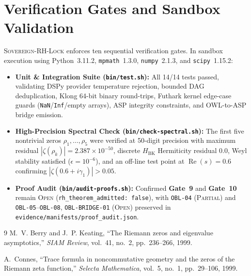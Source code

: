 \documentclass[11pt,letterpaper]{article}
\begin{document}
\section{Verification Gates and Sandbox Validation}

\textsc{Sovereign-RH-Lock} enforces ten sequential verification gates. In sandbox execution using Python~3.11.2, \texttt{mpmath}~1.3.0, \texttt{numpy}~2.1.3, and \texttt{scipy}~1.15.2:
\begin{itemize}
    \item \textbf{Unit \& Integration Suite (\texttt{bin/test.sh}):} All 14/14 tests passed, validating DSPy provider temperature rejection, bounded DAG deduplication, Klong 64-bit binary round-trips, Futhark kernel edge-case guards (\texttt{NaN}/\texttt{Inf}/empty arrays), ASP integrity constraints, and OWL-to-ASP bridge emission.
    \item \textbf{High-Precision Spectral Check (\texttt{bin/check-spectral.sh}):} The first five nontrivial zeros $\rho_1, \dots, \rho_5$ were verified at 50-digit precision with maximum residual $|\zeta(\rho_k)| = 2.387 \times 10^{-50}$, discrete $H_{\mathrm{BK}}$ Hermiticity residual $0.0$, Weyl stability satisfied ($\epsilon = 10^{-6}$), and an off-line test point at $\operatorname{Re}(s) = 0.6$ confirming $|\zeta(0.6 + i\gamma_1)| > 0.05$.
    \item \textbf{Proof Audit (\texttt{bin/audit-proofs.sh}):} Confirmed \textbf{Gate~9} and \textbf{Gate~10} remain \textsc{Open} (\texttt{rh\_theorem\_admitted: false}), with \texttt{OBL-04} (\textsc{Partial}) and \texttt{OBL-05}--\texttt{OBL-08}, \texttt{OBL-BRIDGE-01} (\textsc{Open}) preserved in \texttt{evidence/manifests/proof\_audit.json}.
\end{itemize}

\begin{thebibliography}{9}
M.~V. Berry and J.~P. Keating, ``The Riemann zeros and eigenvalue asymptotics,'' \emph{SIAM Review}, vol.~41, no.~2, pp.~236--266, 1999.

A.~Connes, ``Trace formula in noncommutative geometry and the zeros of the Riemann zeta function,'' \emph{Selecta Mathematica}, vol.~5, no.~1, pp.~29--106, 1999.
\end{thebibliography}
\end{document}
